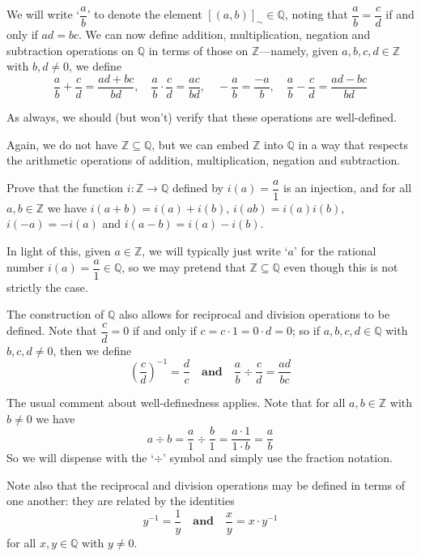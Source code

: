 We will write `$\dfrac{a}{b}$' to denote the element $[(a,b)]_{\sim} \in \mathbb{Q}$, noting that $\dfrac{a}{b} = \dfrac{c}{d}$ if and only if $ad=bc$. We can now define addition, multiplication, negation and subtraction operations on $\mathbb{Q}$ in terms of those on $\mathbb{Z}$---namely, given $a,b,c,d \in \mathbb{Z}$ with $b,d \ne 0$, we define
\[ \dfrac{a}{b} + \dfrac{c}{d} = \dfrac{ad+bc}{bd}, \quad \dfrac{a}{b} \cdot \dfrac{c}{d} = \dfrac{ac}{bd}, \quad -\dfrac{a}{b} = \dfrac{-a}{b}, \quad \dfrac{a}{b} - \dfrac{c}{d} = \dfrac{ad-bc}{bd} \]

As always, we should (but won't) verify that these operations are well-defined.

Again, we do not have $\mathbb{Z} \subseteq \mathbb{Q}$, but we can embed $\mathbb{Z}$ into $\mathbb{Q}$ in a way that respects the arithmetic operations of addition, multiplication, negation and subtraction.

\begin{exercise}
Prove that the function $i : \mathbb{Z} \to \mathbb{Q}$ defined by $i(a) = \dfrac{a}{1}$ is an injection, and for all $a,b \in \mathbb{Z}$ we have $i(a+b) = i(a)+i(b)$, $i(ab) = i(a)i(b)$, $i(-a) = -i(a)$ and $i(a-b) = i(a)-i(b)$.
\end{exercise}

In light of this, given $a \in \mathbb{Z}$, we will typically just write `$a$' for the rational number $i(a) = \dfrac{a}{1} \in \mathbb{Q}$, so we may pretend that $\mathbb{Z} \subseteq \mathbb{Q}$ even though this is not strictly the case.

The construction of $\mathbb{Q}$ also allows for reciprocal and division operations to be defined. Note that $\dfrac{c}{d} = 0$ if and only if $c = c \cdot 1 = 0 \cdot d = 0$; so if $a,b,c,d \in \mathbb{Q}$ with $b,c,d \ne 0$, then we define
\[ \left(\dfrac{c}{d} \right)^{-1} = \dfrac{d}{c} \quad \textbf{and} \quad \frac{a}{b} \div \frac{c}{d} = \dfrac{ad}{bc} \]

The usual comment about well-definedness applies. Note that for all $a,b \in \mathbb{Z}$ with $b \ne 0$ we have
\[ a \div b = \dfrac{a}{1} \div \dfrac{b}{1} = \dfrac{a \cdot 1}{1 \cdot b} = \dfrac{a}{b} \]
So we will dispense with the `$\div$' symbol and simply use the fraction notation.

Note also that the reciprocal and division operations may be defined in terms of one another: they are related by the identities
\[ y^{-1} = \dfrac{1}{y} \quad \textbf{and} \quad \dfrac{x}{y} = x \cdot y^{-1} \]
for all $x,y \in \mathbb{Q}$ with $y \ne 0$.

